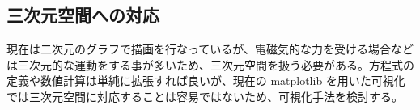 




\subsection{三次元空間への対応}
現在は二次元のグラフで描画を行なっているが、電磁気的な力を受ける場合などは三次元的な運動をする事が多いため、三次元空間を扱う必要がある。方程式の定義や数値計算は単純に拡張すれば良いが、現在の matplotlib を用いた可視化では三次元空間に対応することは容易ではないため、可視化手法を検討する。


